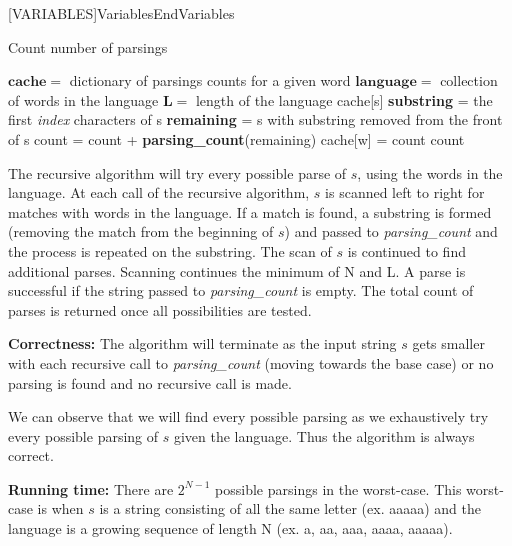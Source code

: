 \documentclass[11pt]{article}
\newcommand\correctness{\vspace{.10in}\textbf{Correctness: }}
\newcommand\runtime{\vspace{.10in}\textbf{Running time: }}
\begin{document}
[VARIABLES]{Variables}{EndVariables}
   {\algorithmicvariables}
   {\algorithmicend\ \algorithmicvariables}

\begin{algorithm}[H]
\caption{Count number of parsings}
\label{CHalgorithm}
\begin{algorithmic}[1]
\Variables
\State $\mathbf{cache} = $ dictionary of parsings counts for a given word
\State $\mathbf{language} =$ collection of words in the language
\State $\mathbf{L} =$ length of the language
\EndVariables
\State
{}
	\State {}
\EndIf
\State
{}
	\State \Return cache[s]
\EndIf
\State
{}
	\State \textbf{substring} = the first \textit{index} characters of s
		\State \textbf{remaining} = s with substring removed from the front of s
		\State count = count + \textbf{parsing\_count}(remaining)
	\EndIf
\EndFor
\State
\State cache[w] = count
\State \Return count
\EndProcedure
\end{algorithmic}
\end{algorithm}

The recursive algorithm will try every possible parse of $s$, using the words in the language. At each call of the recursive algorithm, $s$ is scanned left to right for matches with words in the language. If a match is found, a substring is formed (removing the match from the beginning of $s$) and passed to \textit{parsing\_count} and the process is repeated on the substring. The scan of $s$ is continued to find additional parses. Scanning continues the minimum of N and L. A parse is successful if the string passed to \textit{parsing\_count} is empty. The total count of parses is returned once all possibilities are tested.

\correctness The algorithm will terminate as the input string $s$ gets smaller with each recursive call to \textit{parsing\_count} (moving towards the base case) or no parsing is found and no recursive call is made.

We can observe that we will find every possible parsing as we exhaustively try every possible parsing of $s$ given the language. Thus the algorithm is always correct. 

\runtime There are $2^{N-1}$ possible parsings in the worst-case. This worst-case is when $s$ is a string consisting of all the same letter (ex. aaaaa) and the language is a growing sequence of length N (ex. a, aa, aaa, aaaa, aaaaa).
\end{document}
